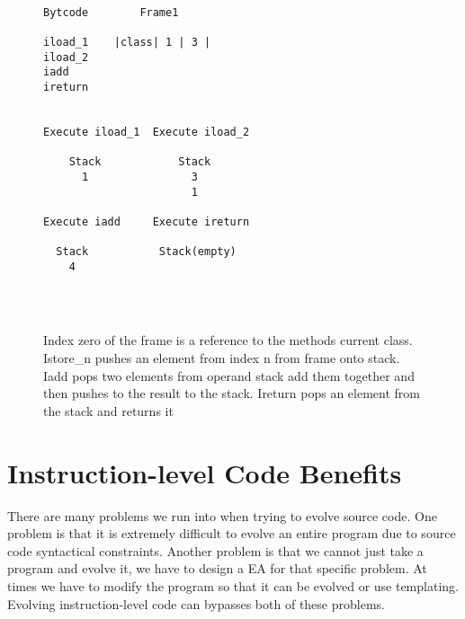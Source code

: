 \documentclass{sig-alternate}
\begin{document}
\begin{figure}
\centering
{\tt
\begin{verbatim}
Bytcode        Frame1  
           
iload_1	   |class| 1 | 3 |	
iload_2    
iadd       
ireturn


Execute iload_1  Execute iload_2   

    Stack            Stack            
      1                3               
                       1
                       
Execute iadd     Execute ireturn

  Stack           Stack(empty)
    4


          
\end{verbatim}
}
\caption{Index zero of the frame is a reference to the methods current class. Istore\_n pushes an element from index n from frame onto stack. Iadd pops two elements from operand stack add them together and then pushes to the result to the stack. Ireturn pops an element from the stack and returns it}
\label{stack}
\end{figure}


\section{Instruction-level Code Benefits}

There are many problems we run into when trying to evolve source code. One problem is that it is extremely difficult to evolve an entire program due to source code syntactical constraints. Another problem is that we cannot just take a program and evolve it, we have to design a EA for that specific problem. At times we have to modify the program so that it can be evolved or use templating. Evolving instruction-level code can bypasses both of these problems.
\end{document}
